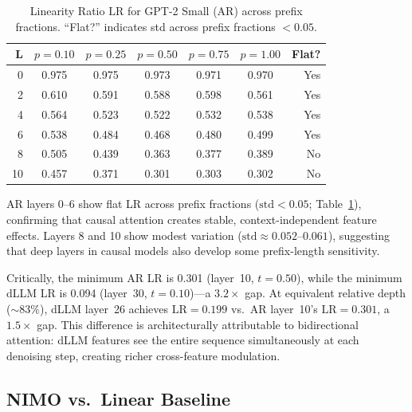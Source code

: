 \documentclass{article}
\newcommand{\LR}{\mathrm{LR}}
\begin{document}
\begin{table}[t]
\centering
\caption{Linearity Ratio $\LR$ for GPT-2 Small (AR) across prefix fractions. ``Flat?'' indicates std across prefix fractions $< 0.05$.}
\label{tab:lr_ar}
\vskip 0.1in
\begin{small}
\begin{sc}
\begin{tabular}{r ccccc r}
\toprule
\textbf{L} & $p{=}0.10$ & $p{=}0.25$ & $p{=}0.50$ & $p{=}0.75$ & $p{=}1.00$ & \textbf{Flat?} \\
\midrule
0  & 0.975 & 0.975 & 0.973 & 0.971 & 0.970 & Yes \\
2  & 0.610 & 0.591 & 0.588 & 0.598 & 0.561 & Yes \\
4  & 0.564 & 0.523 & 0.522 & 0.532 & 0.538 & Yes \\
6  & 0.538 & 0.484 & 0.468 & 0.480 & 0.499 & Yes \\
8  & 0.505 & 0.439 & 0.363 & 0.377 & 0.389 & No  \\
10 & 0.457 & 0.371 & 0.301 & 0.303 & 0.302 & No  \\
\bottomrule
\end{tabular}
\end{sc}
\end{small}
\end{table}

AR layers 0--6 show flat LR across prefix fractions ($\mathrm{std} < 0.05$; Table~\ref{tab:lr_ar}), confirming that causal attention creates stable, context-independent feature effects.
Layers 8 and 10 show modest variation ($\mathrm{std} \approx 0.052$--$0.061$), suggesting that deep layers in causal models also develop some prefix-length sensitivity.

Critically, the minimum AR LR is 0.301 (layer~10, $t = 0.50$), while the minimum dLLM LR is 0.094 (layer~30, $t = 0.10$)---a $3.2\times$ gap. At equivalent relative depth (${\sim}83\%$), dLLM layer~26 achieves $\LR = 0.199$ vs.\ AR layer~10's $\LR = 0.301$, a $1.5\times$ gap. This difference is architecturally attributable to bidirectional attention: dLLM features see the entire sequence simultaneously at each denoising step, creating richer cross-feature modulation.

\subsection{NIMO vs.\ Linear Baseline}
\end{document}
